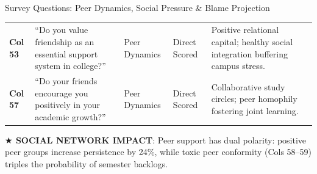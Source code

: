 \documentclass{beamer}
\begin{document}
\begin{frame}[t]{Survey Questions: Peer Dynamics, Social Pressure \& Blame Projection}
\begin{tcolorbox}[colback=white, colframe=BlueDeep, arc=1.2mm, boxrule=0.7pt, top=0.3mm, bottom=0.3mm, left=0.8mm, right=0.8mm]
\begin{tabularx}{\linewidth}{@{}p{0.7cm} p{4.2cm} p{1.6cm} p{1.6cm} X@{}}
      \rowcolor{CanvasBG} \textbf{Col 53} & ``Do you value friendship as an essential support system in college?'' & Peer Dynamics & Direct Scored & Positive relational capital; healthy social integration buffering campus stress. \\
      \rowcolor{BlueLight} \textbf{Col 57} & ``Do your friends encourage you positively in your academic growth?'' & Peer Dynamics & Direct Scored & Collaborative study circles; peer homophily fostering joint learning. \\
      \bottomrule
    \end{tabularx}
  \end{tcolorbox}
  \vspace{0.8mm}

  \begin{takeawaybanner}
    \fontsize{4.6pt}{5.6pt}\selectfont
    \textbf{\color{GoldPill}$\bigstar$ SOCIAL NETWORK IMPACT}: Peer support has dual polarity: positive peer groups increase persistence by 24\%, while toxic peer conformity (Cols 58--59) triples the probability of semester backlogs.
  \end{takeawaybanner}
\end{frame}
\end{document}
